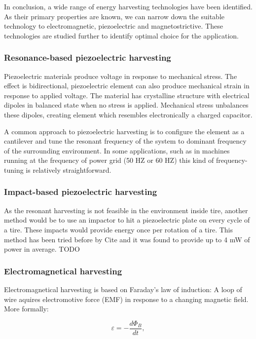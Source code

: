In conclusion, a wide range of energy harvesting technologies have been identified. As their primary properties are known, we can narrow down the suitable technology to electromagnetic, piezoelectric and magnetostrictive. These technologies are studied further to identify optimal choice for the application.

\subsubsection{Resonance-based piezoelectric harvesting}
Piezoelectric materials produce voltage in response to mechanical stress. The effect is bidirectional, piezoelectric element can also produce mechanical strain in response to applied voltage. The material has crystalline structure with electrical dipoles in balanced state when no stress is applied. Mechanical stress unbalances these dipoles, creating element which resembles electronically a charged capacitor. 

A common approach to piezoelectric harvesting is to configure the element as a cantilever and tune the resonant frequency of the system to dominant frequency of the surrounding environment. In some applications, such as in machines running at the frequency of power grid (50 HZ or 60 HZ) this kind of frequency-tuning is relatively straightforward. 




\subsubsection{Impact-based piezoelectric harvesting}
As the resonant harvesting is not feasible in the environment inside tire, another method would be to use an impactor to hit a piezoelectric plate on every cycle of a tire. These impacts would provide energy once per rotation of a tire. This method has been tried before by {\color{red} Cite} and it was found to provide up to 4 mW of power in average. TODO



\subsubsection{Electromagnetical harvesting}
Electromagnetical harvesting is based on Faraday's law of induction: A loop of wire aquires electromotive force (EMF) in response to a changing magnetic field. More formally:

\begin{equation}
  \varepsilon = - \frac{d \Phi_ {B}}{d t} , 
\end{equation}

